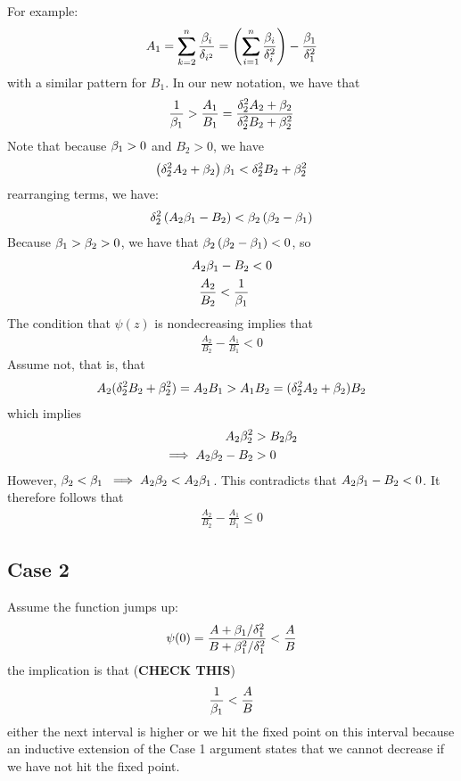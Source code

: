 \documentclass[12pt,leqno,letterpaper]{article}
\begin{document}
{{For example:
\begin{align*}
A_1 = \sum_{k=2}^{n} \frac{\gb_{i}}{\gd_{i^2}} = \paren{\sum_{i=1}^n \frac{\gb_{i}}{\gd_{i}^2}} - \frac{\gb_{1}}{\gd_{1}^2}
\end{align*}
with a similar pattern for $B_1$.
In our new notation, we have that
\begin{align}
\frac{1}{\beta_1} > \frac{A_1}{B_1} = \frac{\delta_{2}^2 A_2 + \beta_{2}}{\delta_{2}^2 B_2 + \beta_{2}^2}
\end{align}
Note that because $\beta_1>0$ and $B_2>0$, we have
\begin{align}
 \left(\delta_2^2 A_2 + \beta_2\right)\beta_1<\delta_2^2 B_2 + \beta_2^2 
\end{align}
rearranging terms, we have:
\begin{align}
\delta_2^2 \left(A_2\beta_1 - B_2\right)<\beta_2 \left(\beta_2 - \beta_1\right)
\end{align}
Because $\beta_1>\beta_2 >0$, we have that $\beta_2\left(\beta_2-\beta_1\right)<0$, so
\begin{align}
A_2 \beta_1 - B_2 &<0\\
\frac{A_2}{B_2}< \frac{1}{\beta_1}
\end{align}
The condition that $\psi(z)$ is nondecreasing implies that 
\begin{align}
\frac{A_2}{B_2}-\frac{A_1}{B_1}  < 0
\end{align}
}
Assume not, that is, that
\begin{align}
A_2 (\delta_2^2 B_2 + \beta_2^2 )= A_2 B_1 > A_1 B_2 =(\delta_2^2 A_2 + \beta_2) B_2
\end{align}
which implies
\begin{align}
A_2 \beta_2^2 &> B_2 \beta_2\\
\implies A_2 \beta_2 - B_2 &> 0
\end{align}
However, $\beta_2 < \beta_1 \; \implies A_2 \beta_2 < A_2 \beta_1$. This contradicts that $A_2 \beta_1 -B_2 <0$.  It therefore follows that 
\begin{align}
\frac{A_2}{B_2} - \frac{A_1}{B_1} \leq 0
\end{align}
\subsection*{Case 2}
Assume the function jumps up:
\begin{align}
\psi(0)= \frac{A+ \beta_1/\delta_1^2}{B+\beta_1^2/\delta_1^2} < \frac{A}{B}
\end{align}
the implication is that (\textbf{CHECK THIS})
\begin{align}
\frac{1}{\beta_1}< \frac{A}{B}
\end{align}
either the next interval is higher or we hit the fixed point on this interval because an inductive extension of the Case 1 argument states that we cannot decrease if we have not hit the fixed point.
}
\newpage
\fi
\end{document}
